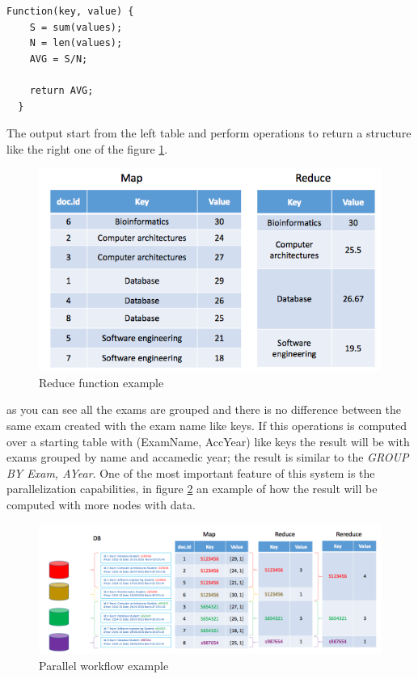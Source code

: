 \documentclass[12pt]{article}
\begin{document}
\begin{lstlisting}[frame=single]
  Function(key, value) {
    S = sum(values);
    N = len(values);
    AVG = S/N;

    return AVG;
  }
\end{lstlisting}

The output start from the left table and perform operations to return a structure like the right one of the figure \ref{fig:reduce}.
\begin{figure}[H]
  \includegraphics[width=\linewidth]{images/reduce.png}
  \caption{Reduce function example}
  \label{fig:reduce}
\end{figure}
as you can see all the exams are grouped and there is no difference between the same exam created with the exam name like keys. If this operations is computed over a starting table with (ExamName, AccYear) like keys the result will be with exams grouped by name and accamedic year; the result is similar to the \textit{GROUP BY Exam, AYear}. One of the most important feature of this system is the parallelization capabilities, in figure \ref{fig:mp_par} an example of how the result will be computed with more nodes with data.
\begin{figure}[H]
  \includegraphics[width=\linewidth]{images/mp_par.png}
  \caption{Parallel workflow example}
  \label{fig:mp_par}
\end{figure}
\end{document}
